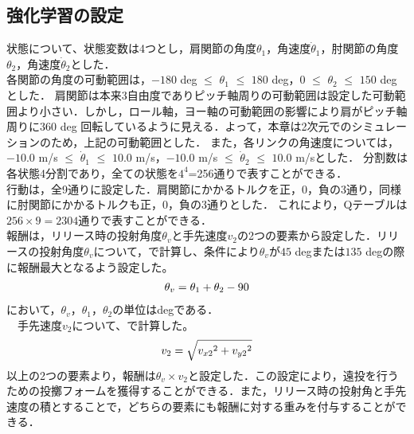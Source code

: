 \begin{small}
\subsection{強化学習の設定}
状態について、状態変数は4つとし，肩関節の角度$\theta_{1}$，角速度$\dot{\theta}_{1}$，肘関節の角度$\theta_{2}$，角速度$\dot{\theta}_{2}$とした．\\
各関節の角度の可動範囲は，$-180$ deg $\le$ $\theta_{1}$ $\le$ $180$ deg，$0$ $\le$ $\theta_{2}$ $\le$ $150$ deg\cite{range}とした．
肩関節は本来3自由度でありピッチ軸周りの可動範囲は設定した可動範囲より小さい．しかし，ロール軸，ヨー軸の可動範囲の影響により肩がピッチ軸周りに$360$ deg 回転しているように見える．よって，本章は2次元でのシミュレーションのため，上記の可動範囲とした．
また，各リンクの角速度については，$-10.0$ m/s $\le$ $\dot{\theta}_{1}$ $\le$ $10.0$ m/s，$-10.0$ m/s $\le$ $\dot{\theta}_{2}$ $\le$ $10.0$ m/sとした．
分割数は各状態4分割であり，全ての状態を$4^{4}$=256通りで表すことができる．\\
行動は，全9通りに設定した．肩関節にかかるトルクを正，0，負の3通り，同様に肘関節にかかるトルクも正，0，負の3通りとした．
これにより，Qテーブルは$256 \times 9=2304$通りで表すことができる．\\
報酬は，リリース時の投射角度$\theta_{v}$と手先速度$v_{2}$の2つの要素から設定した．リリースの投射角度$\theta_{v}$について，で計算し、条件により$\theta_{v}$が$45$ degまたは$135$ degの際に報酬最大となるよう設定した\cite{angle}。
\begin{eqnarray}
  \equlabel{6}
  \theta_{v}=\theta_{1}+\theta_{2}-90
\end{eqnarray}
において，$\theta_{v}$，$\theta_{1}$，$\theta_{2}$の単位はdegである．\\
　手先速度$v_{2}$について、で計算した。
\begin{eqnarray}
  \equlabel{7}
  v_{2}=\sqrt{{v_{x2}}^2+{v_{y2}}^2}
\end{eqnarray}
以上の2つの要素より，報酬は$\theta_{v} \times v_{2}$と設定した．この設定により，遠投を行うための投擲フォームを獲得することができる．また，リリース時の投射角と手先速度の積とすることで，どちらの要素にも報酬に対する重みを付与することができる．\\

\end{small}

